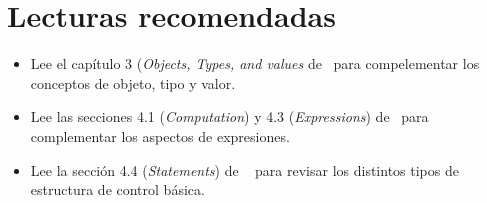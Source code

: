 \section{Lecturas recomendadas}

\begin{itemize}

\item Lee el capítulo 3 (\emph{Objects, Types, and values} de~\cite{stroustrup:2014}
      para compelementar los conceptos de objeto, tipo y valor.

\item Lee las secciones 4.1 (\emph{Computation}) y 4.3 (\emph{Expressions}) 
      de~\cite{stroustrup:2014} para complementar los aspectos de expresiones.

\item Lee la sección 4.4 (\emph{Statements}) de ~\cite{stroustrup:2014} para
      revisar los distintos tipos de estructura de control básica.

\end{itemize}
